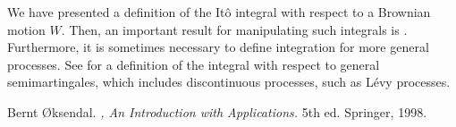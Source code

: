 \documentclass[12pt]{article}
\begin{document}
We have presented a definition of the It\^o integral with respect to a Brownian motion $W$. Then, an important result for manipulating such integrals is .
Furthermore, it is sometimes necessary to define integration for more general processes. See  for a definition of the integral with respect to general semimartingales, which includes discontinuous processes, such as L\'evy processes.


\begin{thebibliography}{9}
Bernt \O{}ksendal.
{\em {},
An Introduction with Applications.} 5th ed. Springer, 1998.
\end{thebibliography}

\end{document}
